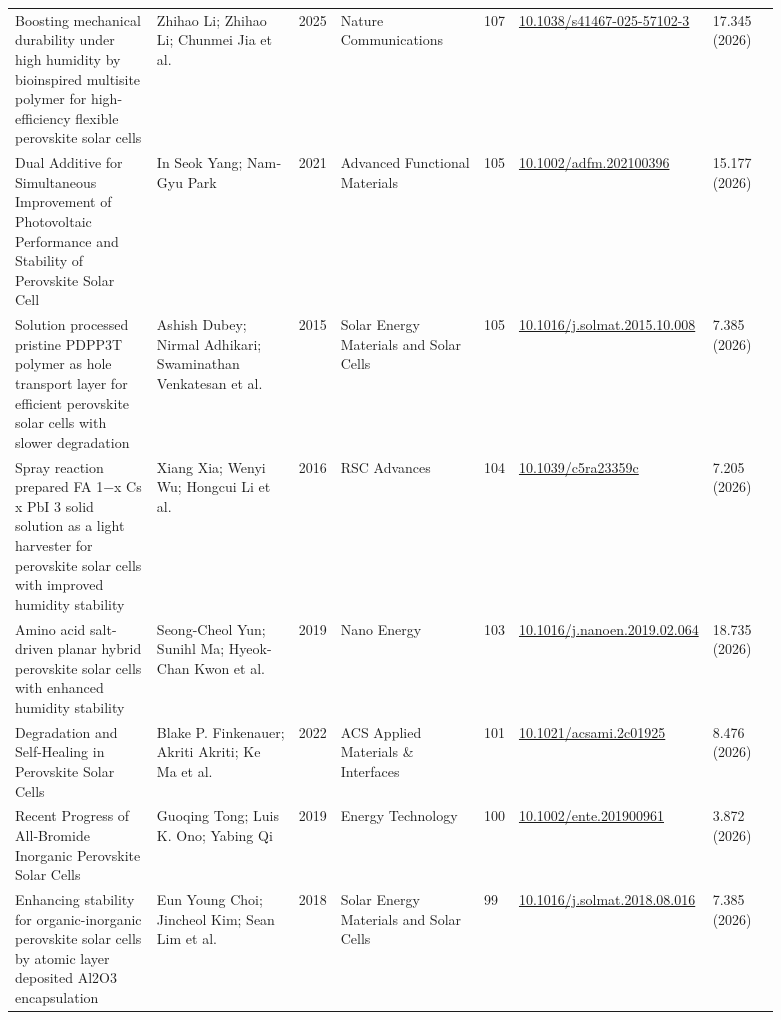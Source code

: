 \documentclass[10pt,a4paper]{article}
\begin{document}
{\begin{longtable}{p{0.197\linewidth}p{0.197\linewidth}p{0.043\linewidth}p{0.197\linewidth}p{0.043\linewidth}p{0.117\linewidth}p{0.098\linewidth}}
Boosting mechanical durability under high humidity by bioinspired multisite polymer for high-efficiency flexible perovskite solar cells & Zhihao Li; Zhihao Li; Chunmei Jia et al. & 2025 & Nature Communications & 107 & \href{https://doi.org/10.1038/s41467-025-57102-3}{10.1038/s41467-025-57102-3} & 17.345 (2026) \\
Dual Additive for Simultaneous Improvement of Photovoltaic Performance and Stability of Perovskite Solar Cell & In Seok Yang; Nam‐Gyu Park & 2021 & Advanced Functional Materials & 105 & \href{https://doi.org/10.1002/adfm.202100396}{10.1002/adfm.202100396} & 15.177 (2026) \\
Solution processed pristine PDPP3T polymer as hole transport layer for efficient perovskite solar cells with slower degradation & Ashish Dubey; Nirmal Adhikari; Swaminathan Venkatesan et al. & 2015 & Solar Energy Materials and Solar Cells & 105 & \href{https://doi.org/10.1016/j.solmat.2015.10.008}{10.1016/j.solmat.2015.10.008} & 7.385 (2026) \\
Spray reaction prepared FA 1−x Cs x PbI 3 solid solution as a light harvester for perovskite solar cells with improved humidity stability & Xiang Xia; Wenyi Wu; Hongcui Li et al. & 2016 & RSC Advances & 104 & \href{https://doi.org/10.1039/c5ra23359c}{10.1039/c5ra23359c} & 7.205 (2026) \\
Amino acid salt-driven planar hybrid perovskite solar cells with enhanced humidity stability & Seong-Cheol Yun; Sunihl Ma; Hyeok-Chan Kwon et al. & 2019 & Nano Energy & 103 & \href{https://doi.org/10.1016/j.nanoen.2019.02.064}{10.1016/j.nanoen.2019.02.064} & 18.735 (2026) \\
Degradation and Self-Healing in Perovskite Solar Cells & Blake P. Finkenauer; Akriti Akriti; Ke Ma et al. & 2022 & ACS Applied Materials \& Interfaces & 101 & \href{https://doi.org/10.1021/acsami.2c01925}{10.1021/acsami.2c01925} & 8.476 (2026) \\
Recent Progress of All‐Bromide Inorganic Perovskite Solar Cells & Guoqing Tong; Luis K. Ono; Yabing Qi & 2019 & Energy Technology & 100 & \href{https://doi.org/10.1002/ente.201900961}{10.1002/ente.201900961} & 3.872 (2026) \\
Enhancing stability for organic-inorganic perovskite solar cells by atomic layer deposited Al2O3 encapsulation & Eun Young Choi; Jincheol Kim; Sean Lim et al. & 2018 & Solar Energy Materials and Solar Cells & 99 & \href{https://doi.org/10.1016/j.solmat.2018.08.016}{10.1016/j.solmat.2018.08.016} & 7.385 (2026) \\

\end{longtable}}
\end{document}
